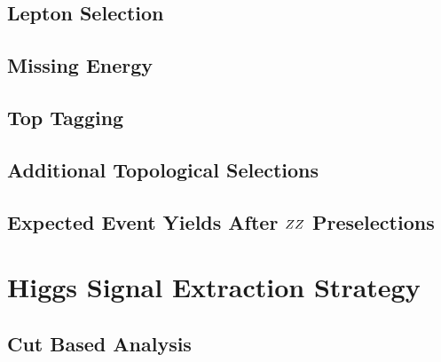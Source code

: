\documentclass{cmspaper}
\begin{document}
  \subsection{Lepton Selection} 
    \label{sec:sel_lepton}
   
%   
%    
  \subsection{Missing Energy} 
    \label{sec:sel_met}
    
%    
  \subsection{Top Tagging}
    \label{sec:sel_toptag}
    
  \subsection{Additional Topological Selections}
    \label{sec:sel_other}
    

\subsection{Expected Event Yields After $ZZ$ Preselections}
\label{sec:yields_mc}
 
\clearpage    

\section{Higgs Signal Extraction Strategy}
  
  \label{sec:signal_selection}
  \subsection{Cut Based Analysis}
    \label{sec:anal_cutbased}
    
\end{document}
